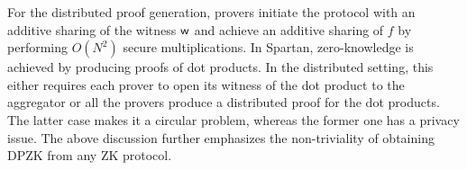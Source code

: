 For the distributed proof generation, provers initiate the protocol with an additive sharing of the witness $\mathsf{w}$ and achieve an additive sharing of $f$ by performing $O(N^2)$ secure multiplications. In Spartan, zero-knowledge is achieved by producing proofs of dot products. In the distributed setting, this either requires each prover to open its witness of the dot product to the aggregator or all the provers produce a distributed proof for the dot products. The latter case makes it a circular problem, whereas the former one has a privacy issue.
The above discussion further emphasizes the non-triviality of obtaining DPZK from any ZK protocol. 
\vspace*{-.3cm}
